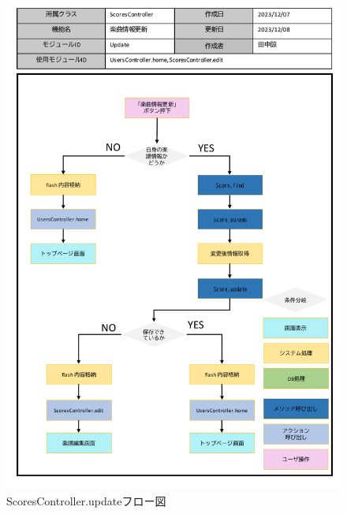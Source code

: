 \begin{figure}
    \centering
    \includegraphics[scale=0.6]{img/Scores/pptx/ScoresController_update.pdf}
    \caption{ScoresController.updateフロー図}
\end{figure}
\clearpage
